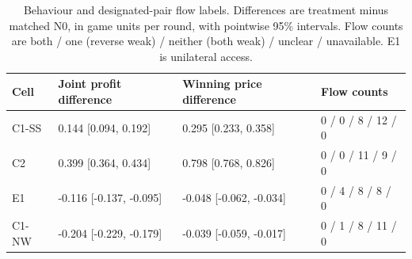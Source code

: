 \begin{table}[tb]\centering\small
\caption{Behaviour and designated-pair flow labels. Differences are treatment minus matched N0, in game units per round, with pointwise 95\% intervals. Flow counts are both / one (reverse weak) / neither (both weak) / unclear / unavailable. E1 is unilateral access.}
\label{tab:behaviour}
\begin{tabular}{@{}llll@{}}\toprule
Cell & Joint profit difference & Winning price difference & Flow counts \\\midrule
C1-SS & 0.144 [0.094, 0.192] & 0.295 [0.233, 0.358] & 0 / 0 / 8 / 12 / 0\\
C2 & 0.399 [0.364, 0.434] & 0.798 [0.768, 0.826] & 0 / 0 / 11 / 9 / 0\\
E1 & -0.116 [-0.137, -0.095] & -0.048 [-0.062, -0.034] & 0 / 4 / 8 / 8 / 0\\
C1-NW & -0.204 [-0.229, -0.179] & -0.039 [-0.059, -0.017] & 0 / 1 / 8 / 11 / 0\\
\bottomrule\end{tabular}
\end{table}
